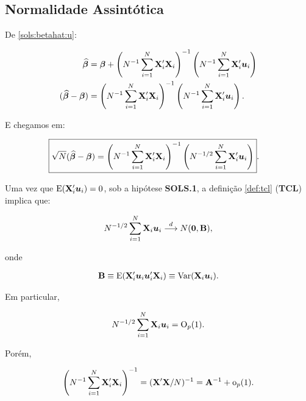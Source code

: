 \documentclass[11pt, oneside, a4paper, article]{article}
\numberwithin{equation}{section}
\begin{document}
\subsection{Normalidade Assintótica}

De \eqref{sols:betahat:u}:

\vspace{-2 em}
\begin{align*} 
\widehat{\boldsymbol{\beta}}  &=
\boldsymbol{\beta} +
\left( N^{-1} \sum_{i=1}^{N} \mathbf{X}_{i}' \mathbf{X}_{i}   \right)^{-1}
\left( N^{-1} \sum_{i=1}^{N} \mathbf{X}_{i}' \boldsymbol{u}_{i}   \right)
\\ 
(\widehat{\boldsymbol{\beta}} - \boldsymbol{\beta}) &= 
\left( N^{-1} \sum_{i=1}^{N} \mathbf{X}_{i}' \mathbf{X}_{i}   \right)^{-1}
\left( N^{-1} \sum_{i=1}^{N} \mathbf{X}_{i}' \boldsymbol{u}_{i}   \right).
\end{align*}

\noindent
E chegamos em:

\vspace{-1 em}
\begin{align} \label{sols:betahat:rootn}
\Aboxed{
\sqrt{N}(\betahatbold - \betavec) &= 
\left( N^{-1} \sum_{i=1}^{N} \Xmat_{i}' \Xmat_{i}   \right)^{-1}
\left( N^{-1/2} \sum_{i=1}^{N} \Xmat_{i}' \uvec_{i}   \right)
}.
\end{align}

Uma vez que $\text{E}(\mathbf{X}_{i}' \boldsymbol{u}_{i})=0$, sob a hipótese \textbf{SOLS.1}, a definição \ref{def:tcl} (\textbf{TCL}) implica que:

\vspace{-1 em}
\begin{align*} 
N^{-1/2} \sum_{i=1}^{N} \mathbf{X}_{i} \boldsymbol{u}_{i}  \overset{d}{\longrightarrow}  N(\boldsymbol{0}, \mathbf{B}),
\end{align*}

\noindent
onde

\vspace{-1 em}
\begin{align*} 
\mathbf{B} \equiv \text{E}(\mathbf{X}_{i}' \boldsymbol{u}_{i} \boldsymbol{u}_{i}' \mathbf{X}_{i}) \equiv \text{Var}(\mathbf{X}_{i} \boldsymbol{u}_{i}).
\end{align*}

\noindent
Em particular,

\vspace{-1 em}
\begin{align*} 
N^{-1/2} \sum_{i=1}^{N} \mathbf{X}_{i} \boldsymbol{u}_{i} = \text{O}_{p}(1).
\end{align*}

Porém,

\vspace{-1 em}
\begin{align*} 
\left( N^{-1} \sum_{i=1}^{N} \mathbf{X}_{i}' \mathbf{X}_{i} \right)^{-1} = (\mathbf{X}'\mathbf{X}/N)^{-1} 
=
\mathbf{A}^{-1} + \text{o}_{p}(1).
\end{align*}
\end{document}
